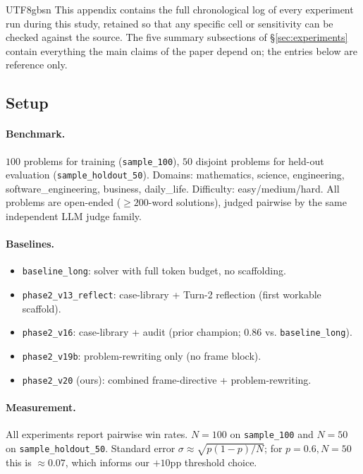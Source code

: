 \documentclass{article}
\begin{document}
\begin{CJK*}{UTF8}{gbsn}
\noindent This appendix contains the full chronological log of every
experiment run during this study, retained so that any specific cell
or sensitivity can be checked against the source. The five summary
subsections of \S\ref{sec:experiments} contain everything the main
claims of the paper depend on; the entries below are reference only.

\subsection{Setup}
\label{sec:setup}

\paragraph{Benchmark.} \(100\) problems for training (\texttt{sample\_100}),
\(50\) disjoint problems for held-out evaluation
(\texttt{sample\_holdout\_50}). Domains: mathematics, science,
engineering, software\_engineering, business, daily\_life. Difficulty:
easy/medium/hard. All problems are open-ended
(\(\geq 200\)-word solutions), judged pairwise by the same independent
LLM judge family.

\paragraph{Baselines.}
\begin{itemize}[leftmargin=*, topsep=2pt, itemsep=1pt]
  \item \texttt{baseline\_long}: solver with full token budget, no
    scaffolding.
  \item \texttt{phase2\_v13\_reflect}: case-library + Turn-2 reflection
    (first workable scaffold).
  \item \texttt{phase2\_v16}: case-library + audit (prior champion;
    \(0.86\) vs. \texttt{baseline\_long}).
  \item \texttt{phase2\_v19b}: problem-rewriting only (no frame block).
  \item \texttt{phase2\_v20} (ours): combined
    frame-directive + problem-rewriting.
\end{itemize}

\paragraph{Measurement.} All experiments report pairwise
win rates. \(N=100\) on \texttt{sample\_100} and \(N=50\) on
\texttt{sample\_holdout\_50}. Standard error \(\sigma \approx
\sqrt{p(1-p)/N}\); for \(p=0.6, N=50\) this is \(\approx 0.07\),
which informs our \(+10\)pp threshold choice.


\end{CJK*}
\end{document}
